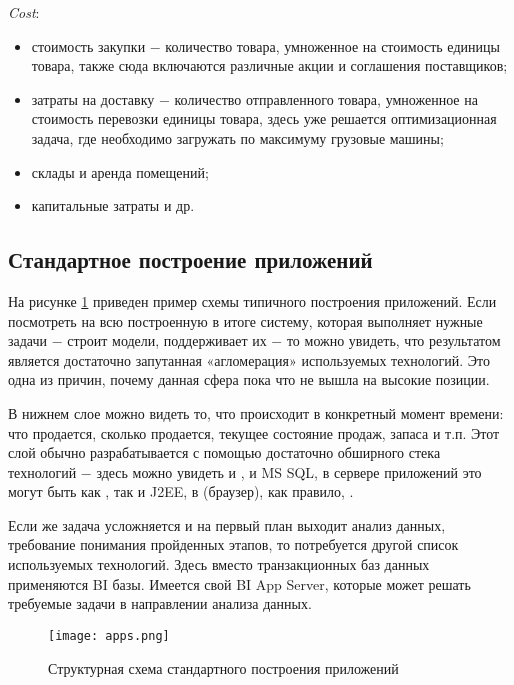 \emph{Cost}:
\begin{itemize}
  \item стоимость закупки ​− количество товара, умноженное на стоимость единицы товара, также сюда включаются различные акции и соглашения поставщиков;
  \item затраты на доставку ​− количество отправленного товара, умноженное на стоимость перевозки единицы товара, здесь уже решается оптимизационная задача, где необходимо загружать по максимуму грузовые машины;
  \item склады и аренда помещений;
  \item капитальные затраты и др.
\end{itemize}

\subsection{Стандартное построение приложений}
\label{sec:domain:standard_app}

На рисунке \ref{fig:domain:standard_app:app_scheme} приведен пример схемы типичного построения приложений. Если посмотреть на всю построенную в итоге систему, которая выполняет нужные задачи ​− строит модели, поддерживает их ​− то можно увидеть, что результатом является достаточно запутанная «агломерация» используемых технологий. Это одна из причин, почему данная сфера пока что не вышла на высокие позиции.

В нижнем слое можно видеть то, что происходит в конкретный момент времени: что продается, сколько продается, текущее состояние продаж, запаса и т.п. Этот слой обычно разрабатывается с помощью достаточно обширного стека технологий ​− здесь можно увидеть и \oracle, и MS SQL, в сервере приложений это могут быть как \dotnet, так и J2EE, в \ui (браузер), как правило, \js.

Если же задача усложняется и на первый план выходит анализ данных, требование понимания пройденных этапов, то потребуется другой список используемых технологий. Здесь вместо транзакционных баз данных применяются BI базы. Имеется свой BI App Server, которые может решать требуемые задачи в направлении анализа данных.

\begin{landscape}
  \begin{figure}
  	\centering
  	\texttt{[image: apps.png]}
  	\caption{Структурная схема стандартного построения приложений}
  	\label{fig:domain:standard_app:app_scheme}
  \end{figure}
\end{landscape}

